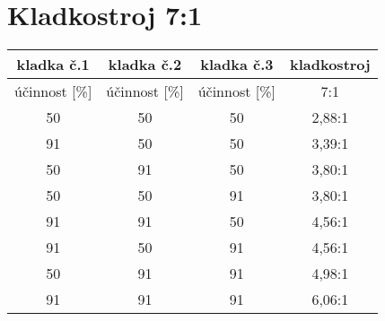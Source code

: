 \section{Kladkostroj 7:1}

\begin{table}[h!]
    \begin{tabular}{|c|c|c|c|}
        \hline
        kladka č.1 & kladka č.2 & kladka č.3 & kladkostroj \\ \hline
        {účinnost [}\%{]}   & {účinnost [}\%{]}   & {účinnost [}\%{]}   & 7:1         \\ \hline
        50                  & 50                  & 50                  & 2,88:1      \\ \hline
        91                  & 50                  & 50                  & 3,39:1      \\ \hline
        50                  & 91                  & 50                  & 3,80:1      \\ \hline
        50                  & 50                  & 91                  & 3,80:1      \\ \hline
        91                  & 91                  & 50                  & 4,56:1      \\ \hline
        91                  & 50                  & 91                  & 4,56:1      \\ \hline
        50                  & 91                  & 91                  & 4,98:1      \\ \hline
        91                  & 91                  & 91                  & 6,06:1      \\ \hline
    \end{tabular}
\end{table}